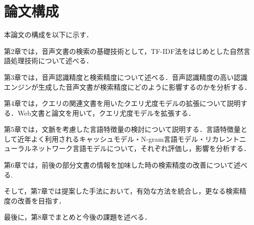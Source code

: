 \section{論文構成}
\noindent
本論文の構成を以下に示す．

第2章では，音声文書の検索の基礎技術として，TF-IDF法をはじめとした自然言語処理技術について述べる．

第3章では，音声認識精度と検索精度について述べる．音声認識精度の高い認識エンジンが生成した音声文書が検索精度にどのように影響するのかを分析する．

第4章では，クエリの関連文書を用いたクエリ尤度モデルの拡張について説明する．Web文書と論文を用いて，クエリ尤度モデルを拡張する．

第5章では，文脈を考慮した言語特徴量の検討について説明する．言語特徴量として近年よく利用されるキャッシュモデル・N-gram言語モデル・リカレントニューラルネットワーク言語モデルについて，それぞれ評価し，影響を分析する．

第6章では，前後の部分文書の情報を加味した時の検索精度の改善について述べる. 

そして，第7章では提案した手法において，有効な方法を統合し，更なる検索精度の改善を目指す． 

最後に，第8章でまとめと今後の課題を述べる．

